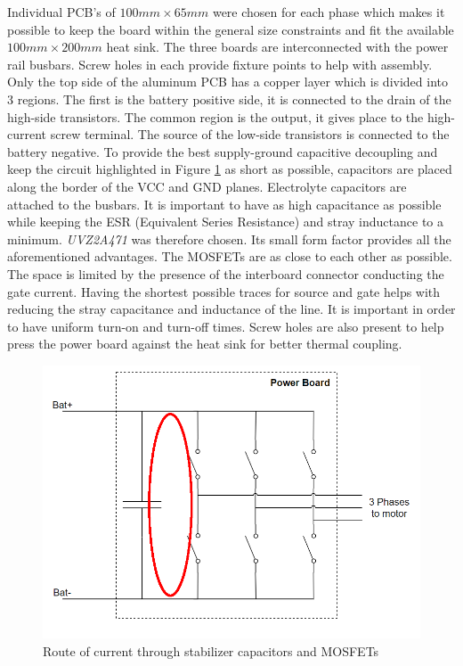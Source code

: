 Individual PCB's of $100mm \times 65mm$ were chosen for each phase which makes it possible to keep the board within the general size constraints and fit the available $100mm \times 200mm$ heat sink. The three boards are interconnected with the power rail busbars. Screw holes in each provide fixture points to help with assembly. Only the top side of the aluminum PCB has a copper layer which is divided into 3 regions. The first is the battery positive side, it is connected to the drain of the high-side transistors. The common region is the output, it gives place to the high-current screw terminal. The source of the low-side transistors is connected to the battery negative. To provide the best supply-ground capacitive decoupling and keep the circuit highlighted in Figure \ref{fig:cap_circ} as short as possible, capacitors are placed along the border of the VCC and GND planes. Electrolyte capacitors are attached to the busbars. It is important to have as high capacitance as possible while keeping the ESR (Equivalent Series Resistance) and stray inductance to a minimum. \textit{UVZ2A471}\cite{elco} was therefore chosen. Its small form factor provides all the aforementioned advantages. The MOSFETs are as close to each other as possible. The space is limited by the presence of the interboard connector conducting the gate current. Having the shortest possible traces for source and gate helps with reducing the stray capacitance and inductance of the line. It is important in order to have uniform turn-on and turn-off times. Screw holes are also present to help press the power board against the heat sink for better thermal coupling.

\begin{figure}[H]
	\centering
	\includegraphics[width=1\textwidth]{pictures/hardware/Power_Board/Sketch_of_powerBoard_circulating.PNG}
	\caption{Route of current through stabilizer capacitors and MOSFETs}
	\label{fig:cap_circ}
\end{figure}


